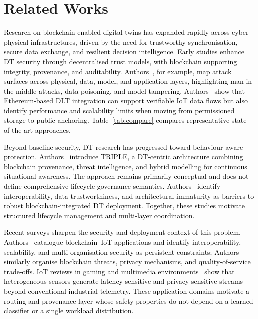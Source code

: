 \documentclass[final,5p,times,twocolumn]{elsarticle}
\begin{document}
\section{\textbf{Related Works}}
\label{sec:review}
\textcolor{black}{Research on blockchain-enabled digital twins has expanded rapidly across cyber-physical infrastructures, driven by the need for trustworthy synchronisation, secure data exchange, and resilient decision intelligence. Early studies enhance DT security through decentralised trust models, with blockchain supporting integrity, provenance, and auditability. Authors~\cite{suleiman2025blockchain}, for example, map attack surfaces across physical, data, model, and application layers, highlighting man-in-the-middle attacks, data poisoning, and model tampering. Authors~\cite{cunat2024blockchain} show that Ethereum-based DLT integration can support verifiable IoT data flows but also identify performance and scalability limits when moving from permissioned storage to public anchoring. Table~\ref{tab:compare} compares representative state-of-the-art approaches.}

\textcolor{black}{Beyond baseline security, DT research has progressed toward behaviour-aware protection. Authors~\cite{suhail2024triple} introduce TRIPLE, a DT-centric architecture combining blockchain provenance, threat intelligence, and hybrid modelling for continuous situational awareness. The approach remains primarily conceptual and does not define comprehensive lifecycle-governance semantics. Authors~\cite{li2023digital} identify interoperability, data trustworthiness, and architectural immaturity as barriers to robust blockchain-integrated DT deployment. Together, these studies motivate structured lifecycle management and multi-layer coordination.}

\textcolor{black}{Recent surveys sharpen the security and deployment context of this problem. Authors~\cite{laghari2023blockchainiot} catalogue blockchain--IoT applications and identify interoperability, scalability, and multi-organisation security as persistent constraints; Authors~\cite{laghari2026blockchainsecurity} similarly organise blockchain threats, privacy mechanisms, and quality-of-service trade-offs. IoT reviews in gaming and multimedia environments~\cite{laghari2025gaming,laghari2025iomt} show that heterogeneous sensors generate latency-sensitive and privacy-sensitive streams beyond conventional industrial telemetry. These application domains motivate a routing and provenance layer whose safety properties do not depend on a learned classifier or a single workload distribution.}
\end{document}
